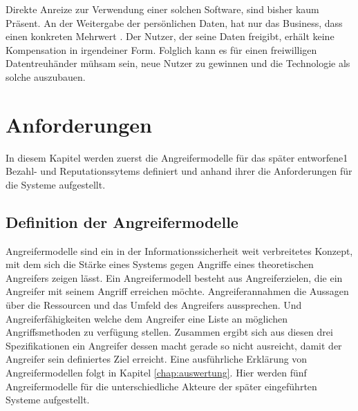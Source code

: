 \documentclass{scrreprt}
\begin{document}
Direkte Anreize zur Verwendung einer solchen Software, sind bisher kaum Präsent. An der Weitergabe der persönlichen Daten, hat nur das Business, dass einen konkreten Mehrwert . Der Nutzer, der seine Daten freigibt, erhält keine Kompensation in irgendeiner Form. Folglich kann es für einen freiwilligen Datentreuhänder mühsam sein, neue Nutzer zu gewinnen und die Technologie als solche auszubauen.




\chapter{Anforderungen}
In diesem Kapitel werden zuerst die Angreifermodelle für das später entworfene1 Bezahl- und Reputationssytems definiert und anhand ihrer die Anforderungen für die Systeme aufgestellt.
\label{chap:req}
\section{Definition der Angreifermodelle}
Angreifermodelle sind ein in der Informationssicherheit weit verbreitetes Konzept, mit dem sich die Stärke eines Systems gegen Angriffe eines theoretischen Angreifers zeigen lässt. Ein Angreifermodell besteht aus Angreiferzielen, die ein Angreifer mit seinem Angriff erreichen möchte. Angreiferannahmen die Aussagen über die Ressourcen und das Umfeld des Angreifers aussprechen. Und Angreiferfähigkeiten welche dem Angreifer eine Liste an möglichen Angriffsmethoden zu verfügung stellen. Zusammen ergibt sich aus diesen drei Spezifikationen ein Angreifer dessen macht gerade so nicht ausreicht, damit der Angreifer sein definiertes Ziel erreicht. Eine ausführliche Erklärung von Angreifermodellen folgt in Kapitel \ref{chap:auswertung}. Hier werden fünf Angreifermodelle für die unterschiedliche Akteure der später eingeführten Systeme aufgestellt.\\
\end{document}
